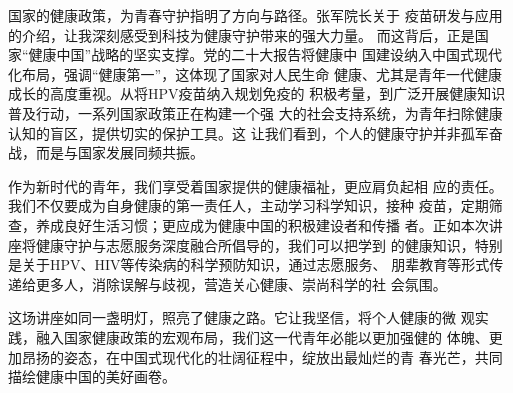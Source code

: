 \documentclass[11pt,a4paper]{ctexart}
\begin{document}
国家的健康政策，为青春守护指明了方向与路径。张军院长关于
疫苗研发与应用的介绍，让我深刻感受到科技为健康守护带来的强大力量。
而这背后，正是国家“健康中国”战略的坚实支撑。党的二十大报告将健康中
国建设纳入中国式现代化布局，强调“健康第一”，这体现了国家对人民生命
健康、尤其是青年一代健康成长的高度重视。从将HPV疫苗纳入规划免疫的
积极考量，到广泛开展健康知识普及行动，一系列国家政策正在构建一个强
大的社会支持系统，为青年扫除健康认知的盲区，提供切实的保护工具。这
让我们看到，个人的健康守护并非孤军奋战，而是与国家发展同频共振。

作为新时代的青年，我们享受着国家提供的健康福祉，更应肩负起相
应的责任。我们不仅要成为自身健康的第一责任人，主动学习科学知识，接种
疫苗，定期筛查，养成良好生活习惯；更应成为健康中国的积极建设者和传播
者。正如本次讲座将健康守护与志愿服务深度融合所倡导的，我们可以把学到
的健康知识，特别是关于HPV、HIV等传染病的科学预防知识，通过志愿服务、
朋辈教育等形式传递给更多人，消除误解与歧视，营造关心健康、崇尚科学的社
会氛围。

这场讲座如同一盏明灯，照亮了健康之路。它让我坚信，将个人健康的微
观实践，融入国家健康政策的宏观布局，我们这一代青年必能以更加强健的
体魄、更加昂扬的姿态，在中国式现代化的壮阔征程中，绽放出最灿烂的青
春光芒，共同描绘健康中国的美好画卷。
\end{document}
